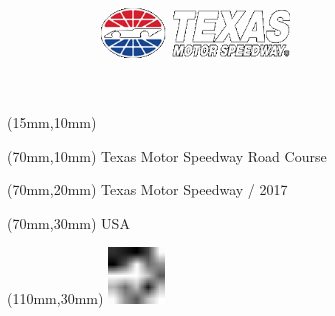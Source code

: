 \null\newpage
\begin{textblock*}{50mm}(15mm,10mm)%
\includegraphics[width=50mm]{LG/TEX.png}
\end{textblock*}
\begin{textblock*}{130mm}(70mm,10mm)%
{\fontsize{20}{20}\selectfont Texas Motor Speedway Road Course}\\
\end{textblock*}
\begin{textblock*}{120mm}(70mm,20mm)%
{\fontsize{16}{16}\selectfont Texas Motor Speedway / 2017}\\
\end{textblock*}
\begin{textblock*}{120mm}(70mm,30mm)%
{\fontsize{12}{12}\selectfont USA}
\end{textblock*}
\begin{textblock*}{30mm}(110mm,30mm)%
\centering
\includegraphics[height=15mm]{icons/fa-rotate-left.pdf}
\end{textblock*}
